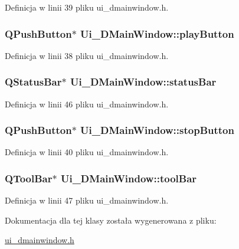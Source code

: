 Definicja w linii 39 pliku ui\-\_\-dmainwindow.\-h.

\hypertarget{class_ui___d_main_window_ad87cbf39ac14374923ed2a2b11e8b1bf}{
\subsubsection[{play\-Button}]{\setlength{\rightskip}{0pt plus 5cm}Q\-Push\-Button$\ast$ Ui\-\_\-\-D\-Main\-Window\-::play\-Button}}\label{class_ui___d_main_window_ad87cbf39ac14374923ed2a2b11e8b1bf}


Definicja w linii 38 pliku ui\-\_\-dmainwindow.\-h.

\hypertarget{class_ui___d_main_window_ac9e025e7279839dd7ab1686456d1ae21}{
\subsubsection[{status\-Bar}]{\setlength{\rightskip}{0pt plus 5cm}Q\-Status\-Bar$\ast$ Ui\-\_\-\-D\-Main\-Window\-::status\-Bar}}\label{class_ui___d_main_window_ac9e025e7279839dd7ab1686456d1ae21}


Definicja w linii 46 pliku ui\-\_\-dmainwindow.\-h.

\hypertarget{class_ui___d_main_window_a1fe7797fff349a0f0d47d90c8438f386}{
\subsubsection[{stop\-Button}]{\setlength{\rightskip}{0pt plus 5cm}Q\-Push\-Button$\ast$ Ui\-\_\-\-D\-Main\-Window\-::stop\-Button}}\label{class_ui___d_main_window_a1fe7797fff349a0f0d47d90c8438f386}


Definicja w linii 40 pliku ui\-\_\-dmainwindow.\-h.

\hypertarget{class_ui___d_main_window_abba1dae1dd835c7a7dd39da623cd4580}{
\subsubsection[{tool\-Bar}]{\setlength{\rightskip}{0pt plus 5cm}Q\-Tool\-Bar$\ast$ Ui\-\_\-\-D\-Main\-Window\-::tool\-Bar}}\label{class_ui___d_main_window_abba1dae1dd835c7a7dd39da623cd4580}


Definicja w linii 47 pliku ui\-\_\-dmainwindow.\-h.



Dokumentacja dla tej klasy została wygenerowana z pliku\-:\begin{DoxyCompactItemize}
\item 
\hyperlink{ui__dmainwindow_8h}{ui\-\_\-dmainwindow.\-h}\end{DoxyCompactItemize}
